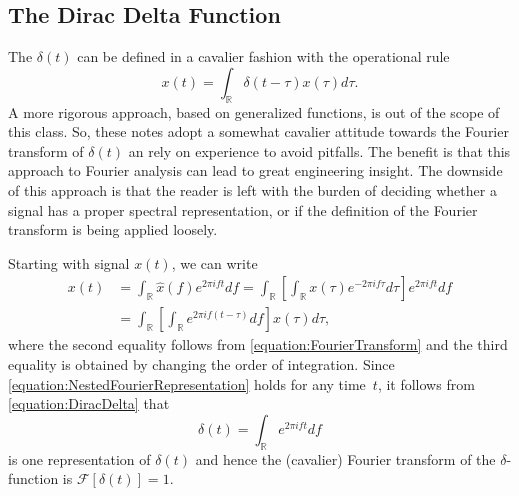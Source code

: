 \subsection{The Dirac Delta Function}

The  $\delta (t)$ can be defined in a cavalier fashion with the operational rule
\begin{equation} \label{equation:DiracDelta}
x(t) = \int_{\mathbb{R}} \delta (t - \tau) x(\tau) d\tau .
\end{equation}
A more rigorous approach, based on generalized functions, is out of the scope of this class.
So, these notes adopt a somewhat cavalier attitude towards the Fourier transform of $\delta(t)$ an rely on experience to avoid pitfalls.
The benefit is that this approach to Fourier analysis can lead to great engineering insight.
The downside of this approach is that the reader is left with the burden of deciding whether a signal has a proper spectral representation, or if the definition of the Fourier transform is being applied loosely.

Starting with signal $x(t)$, we can write
\begin{equation} \label{equation:NestedFourierRepresentation}
\begin{split}
x(t) &= \int_{\mathbb{R}} \hat{x}(f) e^{2 \pi i f t} df
= \int_{\mathbb{R}} \left[ \int_{\mathbb{R}} x(\tau) e^{-2 \pi i f \tau} d\tau \right] e^{2 \pi i f t} df \\
&= \int_{\mathbb{R}} \left[ \int_{\mathbb{R}} e^{2 \pi i f (t - \tau)} df \right] x(\tau) d\tau ,
\end{split}
\end{equation}
where the second equality follows from \eqref{equation:FourierTransform} and the third equality is obtained by changing the order of integration.
Since \eqref{equation:NestedFourierRepresentation} holds for any time~$t$, it follows from \eqref{equation:DiracDelta} that
\begin{equation*}
\delta (t) = \int_{\mathbb{R}} e^{2 \pi i f t} df 
\end{equation*}
is one representation of $\delta(t)$ and hence the (cavalier) Fourier transform of the $\delta$-function is $\mathcal{F} [ \delta(t) ] = 1$.


